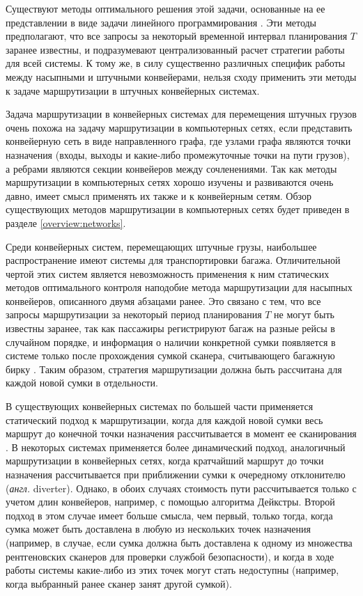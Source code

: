 \documentclass[specification,annotation,times]{itmo-student-thesis}
\theoremstyle{definition}
\begin{document}
Существуют методы оптимального решения этой задачи, основанные на ее
представлении в виде задачи линейного программирования
\cite{ago2007simultaneous}. Эти методы предполагают, что все запросы за
некоторый временной интервал планирования $T$ заранее известны, и подразумевают
централизованный расчет стратегии работы для всей системы. К тому же, в силу
существенно различных специфик работы между насыпными и штучными конвейерами,
нельзя сходу применить эти методы к задаче маршрутизации в штучных конвейерных
системах.

Задача маршрутизации в конвейерных системах для перемещения штучных грузов очень
похожа на задачу маршрутизации в компьютерных сетях, если представить
конвейерную сеть в виде направленного графа, где узлами графа являются точки
назначения (входы, выходы и какие-либо промежуточные точки на пути грузов), а
ребрами являются секции конвейеров между сочленениями. Так как методы
маршрутизации в компьютерных сетях хорошо изучены и развиваются очень давно,
имеет смысл применять их также и к конвейерным сетям. Обзор существующих методов
маршрутизации в компьютерных сетях будет приведен в разделе
\ref{overview:networks}.

Среди конвейерных систем, перемещающих штучные грузы, наибольшее распространение
имеют системы для транспортировки багажа. Отличительной чертой этих систем
является невозможность применения к ним статических методов оптимального
контроля наподобие метода маршрутизации для насыпных конвейеров, описанного
двумя абзацами ранее. Это связано с тем, что все запросы маршрутизации за
некоторый период планирования $T$ не могут быть известны заранее, так как
пассажиры регистрируют багаж на разные рейсы в случайном порядке, и информация о
наличии конкретной сумки появляется в системе только после прохождения сумкой
сканера, считывающего багажную бирку \cite{hallenborg2007decentralized,
  de1994baggage}. Таким образом, стратегия маршрутизации должна быть рассчитана
для каждой новой сумки в отдельности. 

В существующих конвейерных системах по большей части применяется статический
подход к маршрутизации, когда для каждой новой сумки весь маршрут до конечной
точки назначения рассчитывается в момент ее сканирования
\cite{johnstone2009status}.
В некоторых системах применяется более динамический подход, аналогичный
маршрутизации в конвейерных сетях, когда кратчайший маршрут до точки назначения
рассчитывается при приближении сумки к очередному отклонителю (\textit{англ.}
diverter)\cite{hallenborg2007decentralized}. Однако, в обоих случаях стоимость
пути рассчитывается только с учетом длин конвейеров, например, с помощью
алгоритма Дейкстры. Второй подход в этом случае имеет больше смысла, чем первый,
только тогда, когда сумка может быть доставлена в любую из нескольких точек
назначения (например, в случае, если сумка должна быть доставлена к одному из
множества рентгеновских сканеров для проверки службой безопасности), и когда в
ходе работы системы какие-либо из этих точек могут стать недоступны (например,
когда выбранный ранее сканер занят другой сумкой).
\end{document}
